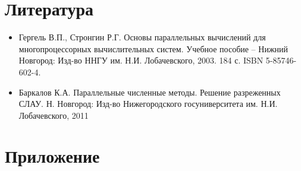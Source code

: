 \documentclass{report}
\begin{document}
\section*{Литература}
\begin{itemize}
\item Гергель В.П., Стронгин Р.Г. Основы параллельных вычислений для многопроцессорных вычислительных систем. Учебное пособие – Нижний Новгород: Изд-во ННГУ им. Н.И. Лобачевского, 2003. 184 с. ISBN 5-85746-602-4.
\item Баркалов К.А. Параллельные численные методы. Решение разреженных СЛАУ. Н. Новгород: Изд-во Нижегородского госуниверситета им. Н.И. Лобачевского, 2011
\end{itemize}
\newpage
\section*{Приложение}
\end{document}

